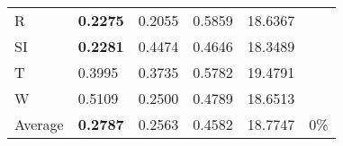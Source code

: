 \documentclass[11pt, a4paper]{article}
\begin{document}
\begin{table}[H]
\begin{tabular}{llllll}
R                                & \textbf{0.2275}                   & 0.2055                            & 0.5859                               & 18.6367                                     &                                   \\
SI                        & \textbf{0.2281}                   & 0.4474                            & 0.4646                               & 18.3489                                     &                                   \\
T                              & 0.3995                            & 0.3735                            & 0.5782                               & 19.4791                                     &                                   \\
W                             & 0.5109                            & 0.2500                            & 0.4789                               & 18.6513                                     &                                   \\ \hline
Average                               & \textbf{0.2787}                   & 0.2563                            & 0.4582                               & 18.7747                                     & 0\%
\end{tabular}
\end{table}
\end{document}
